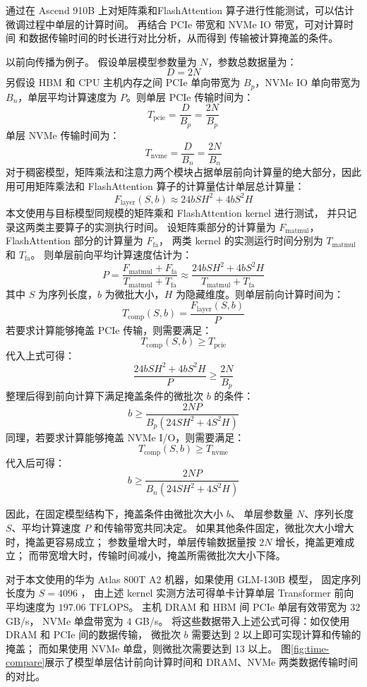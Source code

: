 \documentclass[bachelor,openany,oneside,color,AutoFakeBold=true]{buaathesis}
\begin{document}
通过在 Ascend 910B 上对矩阵乘和FlashAttention
算子进行性能测试，可以估计微调过程中单层的计算时间。
再结合 PCIe 带宽和 NVMe IO 带宽，可对计算时间
和数据传输时间的时长进行对比分析，从而得到
传输被计算掩盖的条件。

以前向传播为例子。
假设单层模型参数量为 $N$，参数总数据量为：
\[
D = 2N
\]
另假设 HBM 和 CPU 主机内存之间 PCIe 单向带宽为 $B_p$，NVMe IO 单向带宽为 $B_n$，单层平均计算速度为 $P$。则单层 PCIe 传输时间为：
\[
T_{\mathrm{pcie}} = \frac{D}{B_p} = \frac{2N}{B_p}
\]
单层 NVMe 传输时间为：
\[
T_{\mathrm{nvme}} = \frac{D}{B_n} = \frac{2N}{B_n}
\]
对于稠密模型，矩阵乘法和注意力两个模块占据单层前向计算量的绝大部分，因此
用可用矩阵乘法和 FlashAttention 算子的计算量估计单层总计算量：
\[
F_{\mathrm{layer}}(S,b) \approx 24bSH^2 + 4bS^2H
\]
本文使用与目标模型同规模的矩阵乘和 FlashAttention kernel 进行测试，
并只记录这两类主要算子的实测执行时间。
设矩阵乘部分的计算量为 $F_{\mathrm{matmul}}$，
FlashAttention 部分的计算量为 $F_{\mathrm{fa}}$，
两类 kernel 的实测运行时间分别为
$T_{\mathrm{matmul}}$ 和 $T_{\mathrm{fa}}$。
则单层前向平均计算速度估计为：
\[
P =
\frac{F_{\mathrm{matmul}} + F_{\mathrm{fa}}}
{T_{\mathrm{matmul}} + T_{\mathrm{fa}}}
\approx
\frac{24bSH^2 + 4bS^2H}
{T_{\mathrm{matmul}} + T_{\mathrm{fa}}}
\]
其中 $S$ 为序列长度，$b$ 为微批大小，$H$ 为隐藏维度。则单层前向计算时间为：
\[
T_{\mathrm{comp}}(S,b) = \frac{F_{\mathrm{layer}}(S,b)}{P}
\]
若要求计算能够掩盖 PCIe 传输，则需要满足：
\[
T_{\mathrm{comp}}(S,b) \ge T_{\mathrm{pcie}}
\]
代入上式可得：
\[
\frac{24bSH^2 + 4bS^2H}{P} \ge \frac{2N}{B_p}
\]
整理后得到前向计算下满足掩盖条件的微批次 $b$ 的条件：
\[
b \ge \frac{2NP}{B_p(24SH^2 + 4S^2H)}
\]
同理，若要求计算能够掩盖 NVMe I/O，则需要满足：
\[
T_{\mathrm{comp}}(S,b) \ge T_{\mathrm{nvme}}
\]
代入后可得：
\[
b \ge \frac{2NP}{B_n(24SH^2 + 4S^2H)}
\]

因此，在固定模型结构下，掩盖条件由微批次大小 $b$、
单层参数量 $N$、序列长度 $S$、平均计算速度 $P$ 和传输带宽共同决定。
如果其他条件固定，微批次大小增大时，掩盖更容易成立；
参数量增大时，单层传输数据量按 $2N$ 增长，掩盖更难成立；
而带宽增大时，传输时间减小，掩盖所需微批次大小下降。

对于本文使用的华为 Atlas 800T A2 机器，如果使用 GLM-130B 模型，
固定序列长度为 $S=4096$ ，
由上述 kernel 实测方法可得单卡计算单层 Transformer 
前向平均速度为 $197.06$ TFLOPS。
主机 DRAM 和 HBM 间 PCIe 单层有效带宽为 $32$ GB/s，
NVMe 单盘带宽为 $4$ GB/s。
将这些数据带入上述公式可得：如仅使用 DRAM 和 PCIe 间的数据传输，
微批次 $b$ 需要达到 2 以上即可实现计算和传输的掩盖；
而如果使用 NVMe 单盘，则微批次需要达到 13 以上。
图\ref{fig:time-compare}展示了模型单层估计前向计算时间和
DRAM、NVMe 两类数据传输时间的对比。
\end{document}
